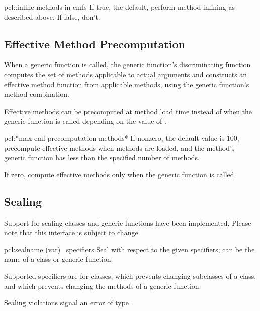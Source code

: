 \begin{defvar}{pcl::}{inline-methods-in-emfs}
  If true, the default, perform method inlining as described above.
  If false, don't.
\end{defvar}



\subsection{Effective Method Precomputation}

When a generic function is called, the generic function's
discriminating function computes the set of methods applicable to
actual arguments and constructs an effective method function from
applicable methods, using the generic function's method combination.

Effective methods can be precomputed at method load time instead of
when the generic function is called depending on the value of
.

\begin{defvar}{pcl:}{*max-emf-precomputation-methods*}
  If nonzero, the default value is 100, precompute effective methods
  when methods are loaded, and the method's generic function has less
  than the specified number of methods.
  
  If zero, compute effective methods only when the generic function is
  called.
\end{defvar}



\subsection{Sealing}

Support for sealing classes and generic functions have been
implemented.  Please note that this interface is subject to change.

\begin{defmac}{pcl:}{seal}{name (var) \amprest\ specifiers}
  Seal  with respect to the given specifiers; 
  can be the name of a class or generic-function.

  Supported specifiers are  for classes,
  which prevents changing subclasses of a class, and 
  which prevents changing the methods of a generic function.
  
  Sealing violations signal an error of type .
\end{defmac}

